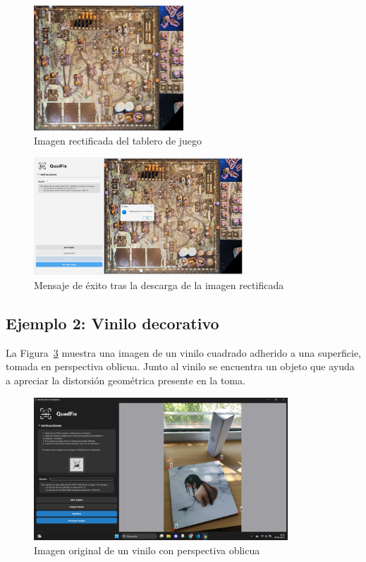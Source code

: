 \begin{figure}[H]
    \centering
    \includegraphics[width=0.50\textwidth]{figures/4.Examples/Cuadrado/Juego2.jpeg}
    \caption{Imagen rectificada del tablero de juego}
    \label{fg:tablero-rectificado}
\end{figure}

\begin{figure}[H]
    \centering
    \includegraphics[width=0.70\textwidth]{figures/4.Examples/Cuadrado/Juego3.png}
    \caption{Mensaje de éxito tras la descarga de la imagen rectificada}
    \label{fg:tablero-descarga}
\end{figure}


\subsection*{Ejemplo 2: Vinilo decorativo}

La Figura~\ref{fg:vinilo-original} muestra una imagen de un vinilo cuadrado adherido a una superficie, tomada en perspectiva oblicua. Junto al vinilo se encuentra un objeto que ayuda a apreciar la distorsión geométrica presente en la toma.

\begin{figure}[H]
    \centering
    \includegraphics[width=0.85\textwidth]{figures/4.Examples/Cuadrado/Vinilo1.png}
    \caption{Imagen original de un vinilo con perspectiva oblicua}
    \label{fg:vinilo-original}
\end{figure}

